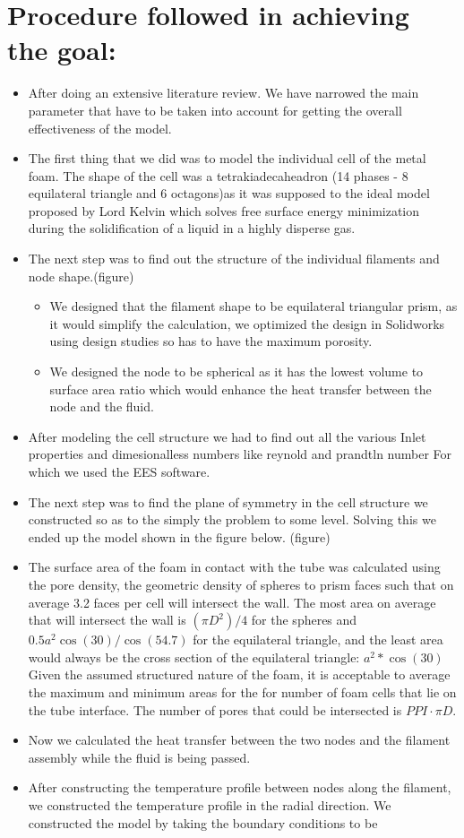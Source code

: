 \documentclass[compileTAMUreport.tex]{subfiles}
\begin{document}
\chapter{Procedure followed in achieving the goal:}
\begin{itemize}
\item After doing an extensive literature review. We have narrowed the main parameter that have to be taken into account for getting the overall effectiveness of the model.
\item The first thing that we did was to model the individual cell of the metal foam. The shape of the cell was a tetrakiadecaheadron (14 phases - 8 equilateral triangle and 6 octagons)as it was supposed to the ideal model proposed by Lord Kelvin which solves free surface energy minimization during the solidification of a liquid in a highly disperse gas.
\item The next step was to find out the structure of the individual filaments and node shape.(figure)
\begin{itemize}

\item We designed that the filament shape to be equilateral triangular prism, as it would simplify the calculation, we optimized the design in Solidworks using design studies so has to have the maximum porosity.
\item We designed the node to be spherical as it has the lowest volume to surface area ratio which would enhance the heat transfer between the node and the fluid.
\end{itemize}
\item After modeling the cell structure we had to find out all the various Inlet properties and dimesionalless numbers like reynold and prandtln number For which we used the EES software.
\item	The next step was to find the plane of symmetry in the cell structure we constructed so as to the simply the problem to some level. Solving this we ended up the model shown in the figure below. (figure)
\item The surface area of the foam in contact with the tube was calculated using the pore density, the geometric density of spheres to prism faces such that on average 3.2 faces per cell will intersect the wall. The most area on average that will intersect the wall is $(\pi D^2)/4$ for the spheres and $0.5 a^2 \cos (30)/ \cos(54.7)$ for the equilateral triangle, and the least area would always be the cross section of the equilateral triangle: $a^2 * \cos(30) $ Given the assumed structured nature of the foam, it is acceptable to average the maximum and minimum areas for the for number of foam cells that lie on the tube interface. The number of pores that could be intersected is $PPI\cdot\pi D$. 
\item	Now we calculated the heat transfer between the two nodes and the filament assembly while the fluid is being passed.
\item After constructing the temperature profile between nodes along the filament, we constructed the temperature profile in the radial direction. We constructed the model by taking the boundary conditions to be 
\begin{itemize}


\end{itemize}
\end{itemize}
\end{document}
